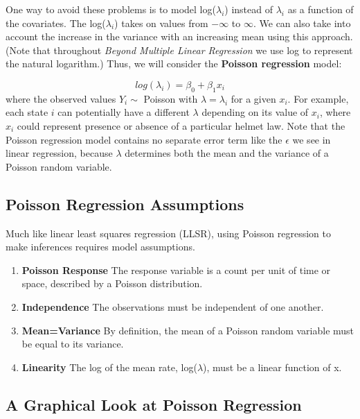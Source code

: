 \documentclass[
]{krantz}
\providecommand{\tightlist}{%
  \setlength{\itemsep}{0pt}\setlength{\parskip}{0pt}}
\begin{document}
One way to avoid these problems is to model log(\(\lambda_i\)) instead of \(\lambda_i\) as a function of the covariates. The log(\(\lambda_i\)) takes on values from \(-\infty\) to \(\infty\). We can also take into account the increase in the variance with an increasing mean using this approach. (Note that throughout \emph{Beyond Multiple Linear Regression} we use log to represent the natural logarithm.) Thus, we will consider the \textbf{Poisson regression}  model:

\begin{equation*}
log(\lambda_i)=\beta_0+\beta_1 x_i
\end{equation*}
where the observed values \(Y_i \sim\) Poisson with \(\lambda=\lambda_i\) for a given \(x_i\). For example, each state \(i\) can potentially have a different \(\lambda\) depending on its value of \(x_i\), where \(x_i\) could represent presence or absence of a particular helmet law. Note that the Poisson regression model contains no separate error term like the \(\epsilon\) we see in linear regression, because \(\lambda\) determines both the mean and the variance of a Poisson random variable.

\hypertarget{poisson-regression-assumptions}{%
\subsection{Poisson Regression Assumptions}\label{poisson-regression-assumptions}}

Much like linear least squares regression (LLSR), using Poisson regression to make inferences requires model assumptions.

\begin{enumerate}
\def\labelenumi{\arabic{enumi}.}
\tightlist
\item
  \textbf{Poisson Response} The response variable is a count per unit of time or space, described by a Poisson distribution.
\item
  \textbf{Independence} The observations must be independent of one another.
\item
  \textbf{Mean=Variance} By definition, the mean of a Poisson random variable must be equal to its variance.
\item
  \textbf{Linearity} The log of the mean rate, log(\(\lambda\)), must be a linear function of x.
\end{enumerate}

\hypertarget{a-graphical-look-at-poisson-regression}{%
\subsection{A Graphical Look at Poisson Regression}\label{a-graphical-look-at-poisson-regression}}
\end{document}
